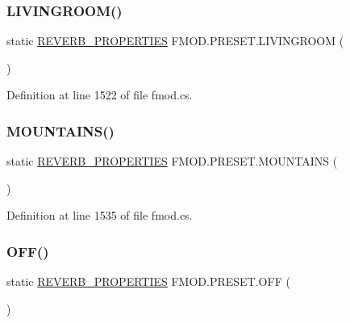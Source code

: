 \subsubsection{\texorpdfstring{L\+I\+V\+I\+N\+G\+R\+O\+O\+M()}{LIVINGROOM()}}
{\footnotesize\ttfamily static \hyperlink{struct_f_m_o_d_1_1_r_e_v_e_r_b___p_r_o_p_e_r_t_i_e_s}{R\+E\+V\+E\+R\+B\+\_\+\+P\+R\+O\+P\+E\+R\+T\+I\+ES} F\+M\+O\+D.\+P\+R\+E\+S\+E\+T.\+L\+I\+V\+I\+N\+G\+R\+O\+OM (\begin{DoxyParamCaption}{ }\end{DoxyParamCaption})\hspace{0.3cm}{\ttfamily [static]}}



Definition at line 1522 of file fmod.\+cs.

\mbox{\label{class_f_m_o_d_1_1_p_r_e_s_e_t_a423a485c6d240e705c110c31ed0d9b21}} 
\subsubsection{\texorpdfstring{M\+O\+U\+N\+T\+A\+I\+N\+S()}{MOUNTAINS()}}
{\footnotesize\ttfamily static \hyperlink{struct_f_m_o_d_1_1_r_e_v_e_r_b___p_r_o_p_e_r_t_i_e_s}{R\+E\+V\+E\+R\+B\+\_\+\+P\+R\+O\+P\+E\+R\+T\+I\+ES} F\+M\+O\+D.\+P\+R\+E\+S\+E\+T.\+M\+O\+U\+N\+T\+A\+I\+NS (\begin{DoxyParamCaption}{ }\end{DoxyParamCaption})\hspace{0.3cm}{\ttfamily [static]}}



Definition at line 1535 of file fmod.\+cs.

\mbox{\label{class_f_m_o_d_1_1_p_r_e_s_e_t_a97c0406d633e3fa3159c9f4787d5144b}} 
\subsubsection{\texorpdfstring{O\+F\+F()}{OFF()}}
{\footnotesize\ttfamily static \hyperlink{struct_f_m_o_d_1_1_r_e_v_e_r_b___p_r_o_p_e_r_t_i_e_s}{R\+E\+V\+E\+R\+B\+\_\+\+P\+R\+O\+P\+E\+R\+T\+I\+ES} F\+M\+O\+D.\+P\+R\+E\+S\+E\+T.\+O\+FF (\begin{DoxyParamCaption}{ }\end{DoxyParamCaption})\hspace{0.3cm}{\ttfamily [static]}}



